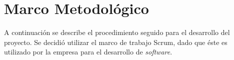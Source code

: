 \chapter{Marco Metodológico} \label{chap:Marco Metodologico}

A continuación se describe el procedimiento seguido para el desarrollo del proyecto. Se decidió utilizar el marco de trabajo Scrum, dado que éste es utilizado por la empresa para el desarrollo de \textit{software}.